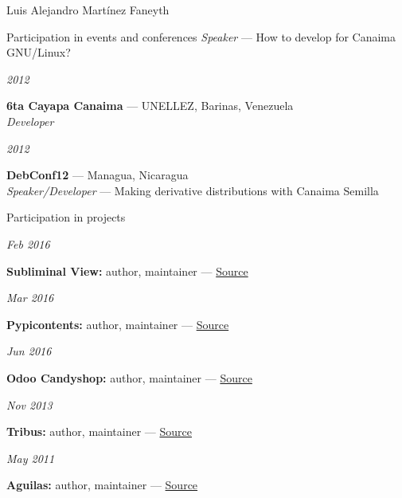 \documentclass[11pt,letterpaper]{article}
\begin{document}
\begin{cv}{Luis Alejandro Mart\'inez Faneyth}
\begin{cvlist}{Participation in events and conferences}
{{		\textit{Speaker} --- How to develop for Canaima GNU/Linux?
	}
}
\item[{\parbox[t]{6em}{\textit{\large{2012}}}}]{
	\parbox[t]{\linewidth}{
		\textbf{6ta Cayapa Canaima} --- UNELLEZ, Barinas, Venezuela\\
		\textit{Developer}
	}
}
\item[{\parbox[t]{6em}{\textit{\large{2012}}}}]{
	\parbox[t]{\linewidth}{
		\textbf{DebConf12} --- Managua, Nicaragua\\
		\textit{Speaker/Developer} --- Making derivative distributions with Canaima Semilla
	}
}
\end{cvlist}

\begin{cvlist}{Participation in projects}
\item[{\parbox[t]{6em}{\textit{\large{Feb 2016}}}}]{
	\parbox[t]{\linewidth}{
		\textbf{Subliminal View:} author, maintainer --- \href{http://github.com/LuisAlejandro/subliminal-view}{Source}
	}
}
\item[{\parbox[t]{6em}{\textit{\large{Mar 2016}}}}]{
	\parbox[t]{\linewidth}{
		\textbf{Pypicontents:} author, maintainer --- \href{http://github.com/LuisAlejandro/pypicontents}{Source}
	}
}
\item[{\parbox[t]{6em}{\textit{\large{Jun 2016}}}}]{
	\parbox[t]{\linewidth}{
		\textbf{Odoo Candyshop:} author, maintainer --- \href{http://github.com/Vauxoo/odoo-candyshop}{Source}
	}
}
\item[{\parbox[t]{6em}{\textit{\large{Nov 2013}}}}]{
	\parbox[t]{\linewidth}{
		\textbf{Tribus:} author, maintainer --- \href{http://github.com/LuisAlejandro/tribus}{Source}
	}
}
\item[{\parbox[t]{6em}{\textit{\large{May 2011}}}}]{
	\parbox[t]{\linewidth}{
		\textbf{Aguilas:} author, maintainer --- \href{http://github.com/LuisAlejandro/aguilas}{Source}
	}
}
\end{cvlist}


\end{cv}
\end{document}
